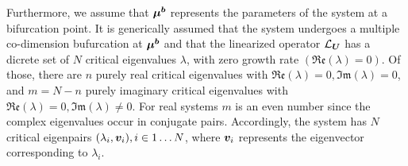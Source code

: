 Furthermore, we assume that $\boldsymbol{\mu^{b}}$ represents the parameters of the system at a bifurcation point. It is generically assumed that the system undergoes a multiple co-dimension bufurcation at $\boldsymbol{\mu^{b}}$ and that the linearized operator $\mathcal{L}_{\boldsymbol{U}}$ has a dicrete set of $N$ critical eigenvalues $\lambda$, with zero growth rate $(\mathfrak{Re}(\lambda) = 0)$. Of those, there are 
$n$ purely real critical eigenvalues with $\mathfrak{Re}(\lambda) = 0, \mathfrak{Im}(\lambda) = 0$, and $m = N - n$ purely imaginary critical eigenvalues with $\mathfrak{Re}(\lambda) = 0, \mathfrak{Im}(\lambda) \ne 0$. For real systems $m$ is an even number since the complex eigenvalues occur in conjugate pairs. Accordingly, the system has $N$ critical eigenpairs $(\lambda_{i},\boldsymbol{v}_{i}), i\in 1\ldots N$, where $\boldsymbol{v}_{i}$ represents the eigenvector corresponding to $\lambda_{i}$. 

